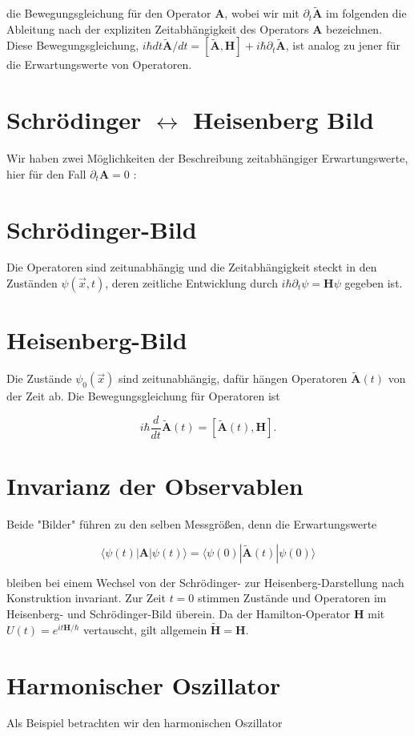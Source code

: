 \documentclass[10pt, letterpaper]{article}
\begin{document}
die Bewegungsgleichung für den Operator $\mathbf{A}$, wobei wir mit $\partial_{t} \tilde{\mathbf{A}}$ im folgenden die Ableitung nach der expliziten Zeitabhängigkeit des Operators $\mathbf{A}$ bezeichnen. Diese Bewegungsgleichung, $i \hbar d t \tilde{\mathbf{A}} / d t=[\tilde{\mathbf{A}}, \mathbf{H}]+i \hbar \partial_{t} \tilde{\mathbf{A}}$, ist analog zu jener für die Erwartungswerte von Operatoren.

\section*{Schrödinger $\leftrightarrow$ Heisenberg Bild}
Wir haben zwei Möglichkeiten der Beschreibung zeitabhängiger Erwartungswerte, hier für den Fall $\partial_{t} \mathbf{A}=0$ :

\section*{Schrödinger-Bild}
Die Operatoren sind zeitunabhängig und die Zeitabhängigkeit steckt in den Zuständen $\psi(\vec{x}, t)$, deren zeitliche Entwicklung durch $i \hbar \partial_{t} \psi=\mathbf{H} \psi$ gegeben ist.

\section*{Heisenberg-Bild}
Die Zustände $\psi_{0}(\vec{x})$ sind zeitunabhängig, dafür hängen Operatoren $\tilde{\mathbf{A}}(t)$ von der Zeit ab. Die Bewegungsgleichung für Operatoren ist

$$
i \hbar \frac{d}{d t} \tilde{\mathbf{A}}(t)=[\tilde{\mathbf{A}}(t), \mathbf{H}] .
$$

\section*{Invarianz der Observablen}
Beide "Bilder" führen zu den selben Messgrößen, denn die Erwartungswerte

$$
\langle\psi(t)| \mathbf{A}|\psi(t)\rangle=\langle\psi(0)| \tilde{\mathbf{A}}(t)|\psi(0)\rangle
$$

bleiben bei einem Wechsel von der Schrödinger- zur Heisenberg-Darstellung nach Konstruktion invariant. Zur Zeit $t=0$ stimmen Zustände und Operatoren im Heisenberg- und Schrödinger-Bild überein. Da der Hamilton-Operator $\mathbf{H}$ mit $U(t)=e^{i t \mathbf{H} / \hbar}$ vertauscht, gilt allgemein $\tilde{\mathbf{H}}=\mathbf{H}$.

\section*{Harmonischer Oszillator}
Als Beispiel betrachten wir den harmonischen Oszillator
\end{document}
